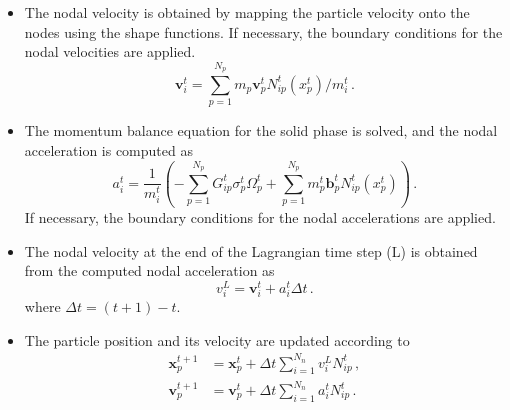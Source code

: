 \begin{itemize}
\item
The nodal velocity is obtained by mapping the particle velocity onto the nodes 
using the shape functions. If necessary, the boundary conditions
for the nodal velocities are applied.
%
\begin{equation}
\mathbf{v}_{\mathit{i}}^{\mathit{t}} = 
\sum\limits_{\mathit{p}=1}^{\mathit{N}_{\mathit{p}}} \mathit{m}_{\mathit{p}} 
\mathbf{v}_{\mathit{p}}^{\mathit{t}} 
\mathbf{\mathit{N}}_{\mathit{ip}}^{\mathit{t}} (x^t_p) / 
\mathit{m}_{\mathit{i}}^{\mathit{t}} \,.
\end{equation}

\item
The momentum balance equation for the solid phase is solved, and the nodal 
acceleration is computed as
\begin{equation}
\mathbf{\mathit{a}}_i^t = \frac{1}{m_i^t} \left( - \sum\limits_{p = 
1}^{N_p}{G}_{ip}^t \sigma_p^t \Omega_p^t + \sum\limits_{p = 
1}^{N_p}m_p^t \mathbf{b}_p^t N_{ip}^t(x^t_p)  \right) \,.
\end{equation}
If necessary, the boundary conditions for the nodal accelerations are applied.


\item
The nodal velocity at the end of the Lagrangian time step (L) is obtained from 
the computed nodal acceleration as
\begin{equation}
\mathbf{\mathit{v}}_{\mathit{i}}^{L} = 
\mathit{\mathbf{v}}_{\mathit{i}}^{\mathit{t}} + 
\mathbf{\mathit{a}}_{\mathit{i}}^{\mathit{t}} \Delta \mathit{t} \,.
\end{equation}
where $\Delta t = (t+1) - t$.

\item
The particle position and its velocity are updated according to
\begin{align}
\nonumber
\mathbf{x}_{\mathit{p}}^{\mathit{t}+1} &  = 
\mathbf{x}_{\mathit{p}}^{\mathit{t}} + 
\Delta \mathit{t} \sum\limits_{\mathit{i}=1}^{\mathit{N}_{n}} 
\mathbf{\mathit{v}}_{\mathit{i}}^{L}\mathit{N}_{\mathit{ip}}^{\mathit{t}} \,, \\
\mathbf{v}_{\mathit{p}}^{\mathit{t}+1} & = \mathbf{v}_{\mathit{p}}^{\mathit{t}} 
+ 
\Delta \mathit{t} \sum\limits_{\mathit{i}=1}^{\mathit{N}_{n}} 
\mathbf{\mathit{a}}_{\mathit{i}}^{t}\mathit{N}_{\mathit{ip}}^{\mathit{t}} \,.
\end{align}



\end{itemize}
